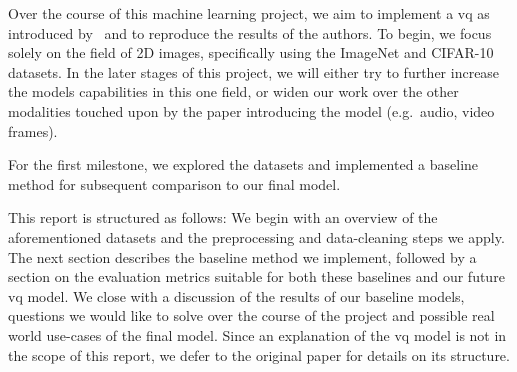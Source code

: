 
Over the course of this machine learning project, we aim to implement a \ac{vq} as introduced by~\cite{vqvae} and to reproduce the results of the authors.
To begin, we focus solely on the field of 2D images, specifically using the ImageNet and CIFAR-10 datasets.
In the later stages of this project, we will either try to further increase the models capabilities in this one field, or widen our work over the other modalities touched upon by the paper introducing the model (e.g.\ audio, video frames).

For the first milestone, we explored the datasets and implemented a baseline method for subsequent comparison to our final model.

This report is structured as follows: We begin with an overview of the aforementioned datasets and the preprocessing and data-cleaning steps we apply.
The next section describes the baseline method we implement, followed by a section on the evaluation metrics suitable for both these baselines and our future \ac{vq} model.
We close with a discussion of the results of our baseline models, questions we would like to solve over the course of the project and possible real world use-cases of the final model.
Since an explanation of the \ac{vq} model is not in the scope of this report, we defer to the original paper for details on its structure.

